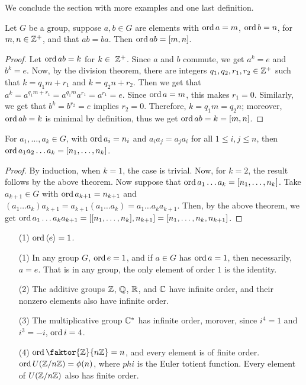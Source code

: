 We conclude the section with more examples and one last definition.

\begin{lemma}\label{1.2.5}
    Let $G$ be a group, suppose  $a,b \in G$ are elements with  $\operatorname{ord}{a}=m$,
    $\operatorname{ord}{b}=n$, for $m,n \in \mathbb{Z}^+$, and that  $ab=ba$. Then  $\operatorname{ord}{ab}=[m,n]$.
\end{lemma}
\begin{proof}
    Let $\operatorname{ord}{ab}=k$ for $k \in \ \mathbb{Z}^+$. Since  $a$ and  $b$ commute, we get
    $a^k=e$ and  $b^k=e$. Now, by the division theorem, there are integers
    $q_1,q_2,r_1,r_2 \in \mathbb{Z}^+$ such that $k=q_1m+r_1$ and $k=q_2n+r_2$. Then we
    get that $a^k=a^{q_1m+r_1}=a^{q_1m}a^{r_1}=a^{r_1}=e$. Since $\operatorname{ord}{a}=m$,
    this makes $r_1=0$. Similarly, we get that $b^k=b^{r_2}=e$ implies $r_2=0$.
    Therefore, $k=q_1m=q_2n$; moreover, $\operatorname{ord}{ab}=k$ is minimal by definition,
    thus we get $\operatorname{ord}{ab}=k=[m,n]$.
\end{proof}
\begin{corollary}
    For $a_1, \dots, a_k \in G$, with $\operatorname{ord}{a_i}=n_i$ and $a_ia_j=a_ja_i$ for
    all  $1 \leq i,j \leq n$, then  $\operatorname{ord}{a_1a_2 \dots a_k}=[n_1, \dots, n_k]$.
\end{corollary}
\begin{proof}
    By induction, when $k=1$, the case is trivial. Now, for  $k=2$, the result
    follows by the above theorem. Now suppose that $\operatorname{ord}{a_1 \dots a_k}=[n_1,
    \dots, n_k]$. Take $a_{k+1} \in G$ with $\operatorname{ord}{a_{k+1}}=n_{k+1}$ and $(a_1
    \dots a_k)a_{k+1}=a_{k+1}(a_1 \dots a_k)=a_1 \dots a_ka_{k+1}$. Then, by the
    above theorem, we get $\operatorname{ord}{a_1 \dots a_ka_{k+1}}=[[n_1, \dots, n_k],
    n_{k+1}]=[n_1, \dots, n_k, n_{k+1}]$.
\end{proof}

\begin{example}
    \begin{enumerate}
        \item[(1)] $\operatorname{ord}{\langle e\rangle}=1$.
        \item[(1)] In any group $G$,  $\operatorname{ord}{e}=1$, and if $a \in G$ has
            $\operatorname{ord}{a}=1$, then necessarily, $a=e$. That is in any group, the only
            element of order  $1$ is the identity.

        \item[(2)] The additive groups $\mathbb{Z}$,  $\mathbb{Q}$,  $\mathbb{R}$, and  $\mathbb{C}$ have
            infinite order, and their nonzero elements also have infinite order.

        \item[(3)] The multiplicative group $\mathbb{C}^*$ has infinite order, morover,
            since $i^4=1$ and $i^3=-i$, $\operatorname{ord}{i}=4$.

        \item[(4)] $\ord{\faktor{\Z}{n\Z}}=n$, and every element is of finite
            order. $\operatorname{ord}{U(\mathbb{Z}/n\mathbb{Z})}=\phi(n)$, where $phi$ is the Euler totient
            function. Every element of $U(\mathbb{Z}/n\mathbb{Z})$ also has finite order.
    \end{enumerate}
\end{example}

